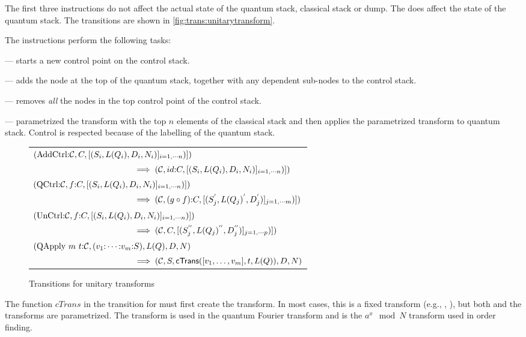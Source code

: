 The first three instructions do not affect the actual state
of the quantum stack, classical stack or dump.
The  does affect the state of the quantum stack.
The transitions  are
shown in \vref{fig:trans:unitarytransform}.

 The instructions perform
the following tasks:
\begin{description}
\item{} --- starts a new control point on the control stack.
\item{} --- adds the node at the top of the 
quantum stack, together
with any dependent sub-nodes to the control stack.
\item{} --- removes \emph{all} the nodes in the top control
point of the control stack.
\item{} --- parametrized the transform 
 with the top $n$ elements of the classical stack and
then applies the parametrized transform to quantum stack. Control is respected
because of the labelling of the quantum stack.
\end{description}

\begin{figure}[htbp]
\begin{tabular}{l}
$(\mathrm{AddCtrl}{:}\mathcal{C},C,[(S_i,L(Q_i),D_i,N_i)]_{i=1,\cdots n})]) $ \\
$\qquad\qquad\qquad\qquad\qquad\qquad\implies (\mathcal{C},id{:}C,[(S_i,L(Q_i),D_i,N_i)]_{i=1,\cdots n})])$\\[12pt]

$(\mathrm{QCtrl}{:}\mathcal{C},f{:}C,[(S_i,L(Q_i),D_i,N_i)]_{i=1,\cdots n})]) $ \\
$\qquad\qquad\qquad\qquad\qquad\qquad\implies (\mathcal{C},(g\circ f){:}C,[(S^{'}_j,L(Q_j)^{'},D^{'}_j)]_{j=1,\cdots m})])$\\[12pt] 
$(\mathrm{UnCtrl}{:}\mathcal{C}, f{:}C,[(S_i,L(Q_i),D_i,N_i)]_{i=1,\cdots n})]) $ \\
$\qquad\qquad\qquad\qquad\qquad\qquad\implies (\mathcal{C},C,[(S^{''}_j,L(Q_j)^{''},D^{''}_j)]_{j=1,\cdots p})])$\\[12pt]
$(\mathrm{QApply}\ m\ t{:}\mathcal{C}, (v_1{:}\cdots {:}v_m{:}S),L(Q),D,N)  $ \\
$\qquad\qquad\qquad\qquad\qquad\qquad\implies (\mathcal{C},S,
           \mathrm{\textsf{cTrans}}([v_1,\ldots,v_m],t,L(Q)),D,N)$ 
\end{tabular}
\caption{Transitions for unitary transforms}\label{fig:trans:unitarytransform}
\end{figure}

The function $cTrans$ in the transition for  must first 
create the transform. In most cases, this is a fixed  transform (e.g., \nottr,
\Had), but both  and the 
 transforms are parametrized. 
The transform   is used in the quantum Fourier transform and 
 is the $a^x \mod N$ transform used in order finding.

